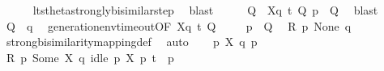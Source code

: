 \begin{isabellebody}
\ \ \ \ \isamarkupfalse%
\ lts{\isacharunderscore}{\kern0pt}theta{\isachardot}{\kern0pt}strongly{\isacharunderscore}{\kern0pt}bisimilar{\isacharunderscore}{\kern0pt}step{\isacharparenleft}{\kern0pt}{}{\isacharparenright}{\kern0pt}\ \isamarkupfalse%
\ blast\isanewline
\ \ \isamarkupfalse%
\ \isamarkupfalse%
\ Q{\isacharprime}{\kern0pt}\ \ {\isacartoucheopen}{\isasymtheta}{\isacharbrackleft}{\kern0pt}X{\isacharbrackright}{\kern0pt}{\isacharparenleft}{\kern0pt}q{\isacharparenright}{\kern0pt}\ {\isasymlongmapsto}\isactrlsup {\isasymtheta}t{\isacharunderscore}{\kern0pt}{\isasymepsilon}\ Q{\isacharprime}{\kern0pt}{\isacartoucheclose}\ {\isacartoucheopen}{\isasymtheta}{\isacharparenleft}{\kern0pt}p{\isacharparenright}{\kern0pt}\ {\isasymleftrightarrow}\ Q{\isacharprime}{\kern0pt}{\isacartoucheclose}\ \isamarkupfalse%
\ blast\isanewline
\ \ \isamarkupfalse%
\ {\isacartoucheopen}Q{\isacharprime}{\kern0pt}\ {\isacharequal}{\kern0pt}\ {\isasymtheta}{\isacharparenleft}{\kern0pt}q{\isacharparenright}{\kern0pt}{\isacartoucheclose}\ \isamarkupfalse%
\ generation{\isacharunderscore}{\kern0pt}env{\isacharunderscore}{\kern0pt}timeout{\isacharbrackleft}{\kern0pt}OF\ {\isacartoucheopen}{\isasymtheta}{\isacharbrackleft}{\kern0pt}X{\isacharbrackright}{\kern0pt}{\isacharparenleft}{\kern0pt}q{\isacharparenright}{\kern0pt}\ {\isasymlongmapsto}\isactrlsup {\isasymtheta}t{\isacharunderscore}{\kern0pt}{\isasymepsilon}\ Q{\isacharprime}{\kern0pt}{\isacartoucheclose}{\isacharbrackright}{\kern0pt}\ \isacommand{{\isachardot}{\kern0pt}{\isachardot}{\kern0pt}}\isamarkupfalse%
\isanewline
\ \ \isamarkupfalse%
\ {\isacartoucheopen}{\isasymtheta}{\isacharparenleft}{\kern0pt}p{\isacharparenright}{\kern0pt}\ {\isasymleftrightarrow}\ Q{\isacharprime}{\kern0pt}{\isacartoucheclose}\ \isamarkupfalse%
\ {\isacartoucheopen}{\isacharquery}{\kern0pt}R\ p\ None\ q{\isacartoucheclose}\ \isamarkupfalse%
\ strong{\isacharunderscore}{\kern0pt}bisimilarity{\isacharunderscore}{\kern0pt}mapping{\isacharunderscore}{\kern0pt}def\ \isamarkupfalse%
\ auto\isanewline
{}\isamarkupfalse%
\isanewline
\ \ \isamarkupfalse%
\ p\ X\ q\ p{\isacharprime}{\kern0pt}\isanewline
\ \ \isamarkupfalse%
\ {\isacartoucheopen}{\isacharquery}{\kern0pt}R\ p\ {\isacharparenleft}{\kern0pt}Some\ X{\isacharparenright}{\kern0pt}\ q{\isacartoucheclose}\ {\isacartoucheopen}idle\ p\ X{\isacartoucheclose}\ {\isacartoucheopen}p\ {\isasymlongmapsto}t\ \ p{\isacharprime}{\kern0pt}{\isacartoucheclose}\isanewline

\end{isabellebody}
